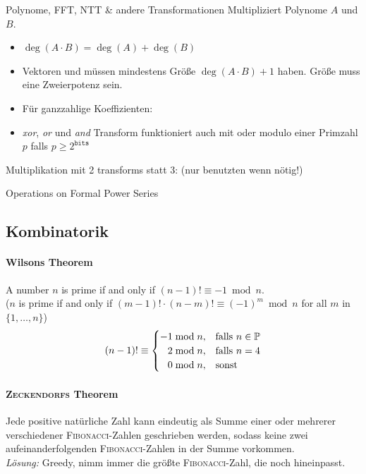 \begin{algorithm}{Polynome, FFT, NTT \& andere Transformationen}
	Multipliziert Polynome $A$ und $B$.
	\begin{itemize}
		\item $\deg(A \cdot B) = \deg(A) + \deg(B)$
		\item Vektoren  und  müssen mindestens Größe
		$\deg(A \cdot B) + 1$ haben.
		Größe muss eine Zweierpotenz sein.
		\item Für ganzzahlige Koeffizienten: 
		\item \emph{xor}, \emph{or} und \emph{and} Transform funktioniert auch mit  oder modulo einer Primzahl $p$ falls $p \geq 2^{\texttt{bits}}$
	\end{itemize}
	Multiplikation mit 2 transforms statt 3: (nur benutzten wenn nötig!)
\end{algorithm}

\begin{algorithm}{Operations on Formal Power Series}
\end{algorithm}
\subsection{Kombinatorik}

\paragraph{Wilsons Theorem}
A number $n$ is prime if and only if
$(n-1)!\equiv -1\bmod{n}$.\\
($n$ is prime if and only if $(m-1)!\cdot(n-m)!\equiv(-1)^m\bmod{n}$ for all $m$ in $\{1,\dots,n\}$)
\begin{align*}
	(n-1)!\equiv\begin{cases}
		-1\bmod{n},&\mathrm{falls}~n \in \mathbb{P}\\
		\hphantom{-}2\bmod{n},&\mathrm{falls}~n = 4\\
		\hphantom{-}0\bmod{n},&\mathrm{sonst}
	\end{cases}
\end{align*}

\paragraph{\textsc{Zeckendorfs} Theorem}
Jede positive natürliche Zahl kann eindeutig als Summe einer oder mehrerer
verschiedener \textsc{Fibonacci}-Zahlen geschrieben werden, sodass keine zwei
aufeinanderfolgenden \textsc{Fibonacci}-Zahlen in der Summe vorkommen.\\
\emph{Lösung:} Greedy, nimm immer die größte \textsc{Fibonacci}-Zahl, die noch
hineinpasst.

